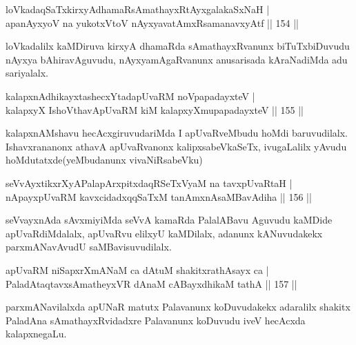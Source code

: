 
\begin{shl}
loVkadaqSaTxkirxyAdhamaRsAmathayxRtAyxgalakaSxNaH |\\
apanAyxyoV na yukotxV\s toV nAyxyavatAmxRsamanavxyAtf \hfill || 154 ||
\end{shl}

\begin{artha}
loVkadalilx kaMDiruva kirxyA dhamaRda sAmathayxRvanunx biTuTxbiDuvudu nAyxya bAhiravAguvudu, nAyxyamAgaRvanunx anusarisada kAraNadiMda adu sariyalalx.
\end{artha}

\begin{shl}
kalapxnAdhikayxtashecxYtadapUvaRM noVpapadayxteV  |\\
kalapxyX IshoV\s thavA\s pUvaRM kiM kalapxyXmupapadayxteV \hfill || 155 ||
\end{shl}

\begin{artha}
kalapxnAMshavu hecAcxgiruvudariMda I apUvaRveMbudu hoMdi baruvudilalx. Ishavxrananonx athavA apUvaRvanonx kalipxsabeVkaSeTx, ivugaLalilx yAvudu hoMdutatxde(yeMbudanunx vivaNiRsabeVku)
\end{artha}


\begin{shl}
seVvAyxtikxrXyAPalapArxpitxdaqRSeTxVyaM na tavxpUvaRtaH |\\
nApayxpUvaRM kavxcidadxqqSaTxM tanAmxnAsaMBavAdiha \hfill || 156 ||
\end{shl}

\begin{artha}
seVvayxnAda sAvxmiyiMda seVvA kamaRda PalalABavu Aguvudu kaMDide  apUvaRdiMdalalx, apUvaRvu elilxyU kaMDilalx, adanunx kANuvudakekx parxmANavAvudU saMBavisuvudilalx.
\end{artha}

\begin{shl}
apUvaRM niSapxrXmANaM ca dAtuM shakitxrathAsayx ca |\\
PaladAtaqtavxsAmatheyxVR dAnaM cABayxdhikaM tathA \hfill || 157 ||
\end{shl}

\begin{artha}%
parxmANavilalxda apUNaR matutx Palavanunx koDuvudakekx adaralilx shakitx PaladAna sAmathayxRvidadxre Palavanunx koDuvudu iveV hecAcxda kalapxnegaLu.
\end{artha}

